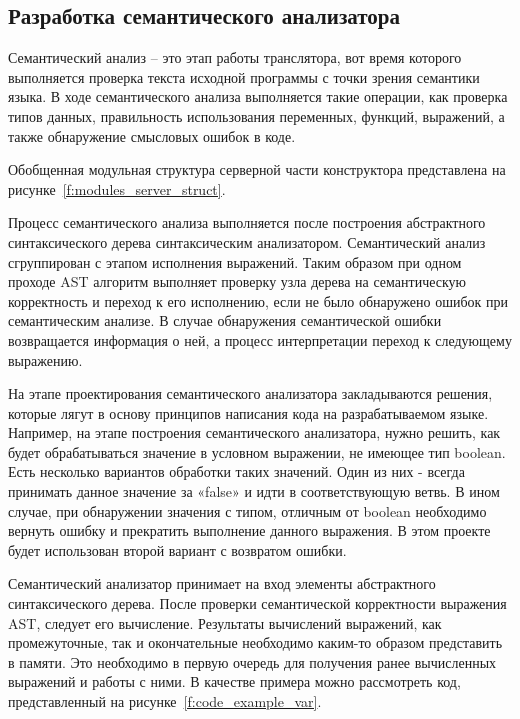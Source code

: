 \subsection{Разработка семантического анализатора}


Семантический анализ – это этап работы транслятора, вот время которого выполняется проверка текста исходной программы с точки зрения семантики языка.
В ходе семантического анализа выполняется такие операции, как проверка типов данных, правильность использования переменных, функций, выражений, а также обнаружение смысловых ошибок в коде.

Обобщенная модульная структура серверной части конструктора представлена на рисунке~\ref{f:modules_server_struct}.

Процесс семантического анализа выполняется после построения абстрактного синтаксического дерева синтаксическим анализатором.
Семантический анализ сгруппирован с этапом исполнения выражений.
Таким образом при одном проходе AST алгоритм выполняет проверку узла дерева на семантическую корректность и переход к его исполнению,
если не было обнаружено ошибок при семантическим анализе. В случае обнаружения семантической ошибки возвращается информация о ней,
а процесс интерпретации переход к следующему выражению.

На этапе проектирования семантического анализатора закладываются решения, которые лягут в основу принципов написания кода на разрабатываемом языке.
Например, на этапе построения семантического анализатора, нужно решить, как будет обрабатываться значение в условном выражении, не имеющее тип boolean.
Есть несколько вариантов обработки таких значений.
Один из них - всегда принимать данное значение за «false» и идти в соответствующую ветвь.
В ином случае, при обнаружении значения с типом, отличным от boolean необходимо вернуть ошибку и прекратить выполнение данного выражения.
В этом проекте будет использован второй вариант с возвратом ошибки.

Семантический анализатор принимает на вход элементы абстрактного синтаксического дерева.
После проверки семантической корректности выражения AST, следует его вычисление.
Результаты вычислений выражений, как промежуточные, так и окончательные необходимо каким-то образом представить в памяти.
Это необходимо в первую очередь для получения ранее вычисленных выражений и работы с ними.
В качестве примера можно рассмотреть код, представленный на рисунке~\ref{f:code_example_var}.

